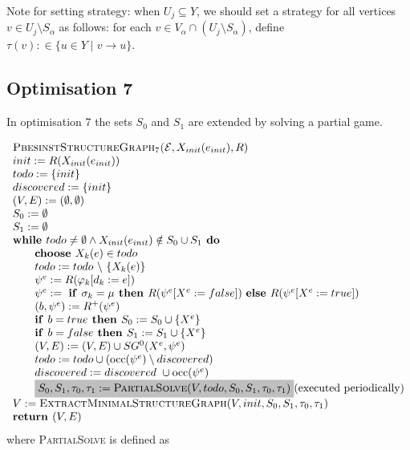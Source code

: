 \documentclass{article}
\newcommand{\Space}{\text{\ }}
\newcommand{\If}{\text{\textbf{if }}}
\newcommand{\Do}{\text{\textbf{ do }}}
\newcommand{\Then}{\text{\textbf{ then }}}
\newcommand{\Else}{\text{\textbf{else }}}
\newcommand{\While}{\text{\textbf{while }}}
\newcommand{\Choose}{\text{\textbf{choose }}}
\newcommand{\Return}{\text{\textbf{return }}}
\begin{document}
Note for setting strategy: when $U_j \subseteq Y$, we should set a strategy for all vertices $v \in U_j \setminus S_\alpha$ as follows: for each $v \in V_\alpha \cap (U_j \setminus S_\alpha)$, define $\tau(v) :\in \{ u \in Y \mid v \to u \}$.

\subsection{Optimisation 7}
In optimisation 7 the sets $S_0$ and $S_1$ are extended by solving a partial game.

\begin{equation*}
\begin{array}{l}
\textsc{PbesinstStructureGraph$_{7}$(}\mathcal{E}, X_{init}(e_{init}), R) \\ 
init:=R(X_{init}(e_{init})) \\
todo:=\{init\} \\
discovered:=\{init\} \\
(V,E) :=(\emptyset ,\emptyset ) \\ 
S_0:= \emptyset \\
S_1:= \emptyset \\
\While todo \neq \emptyset \wedge X_{init}(e_{init}) \notin S_0 \cup S_1 \Do \\ 
\qquad \Choose X_{k}(e)\in todo \\ 
\qquad todo:=todo\ \backslash \ \{X_{k}(e)\} \\ 
\qquad \psi ^{e}:=R(\varphi _{k}[d_{k}:=e]) \\ 
\qquad \psi^e := \Space \If \sigma_k = \mu \Then R(\psi^e[X^e := false])
\Space \Else R(\psi^e[X^e := true]) \\
\qquad (b,\psi^e) := R^+(\psi^e) \\
\qquad \If b = true \Then S_0 := S_0 \cup \{ X^e \} \\
\qquad \If b = false \Then S_1 := S_1 \cup \{ X^e \} \\
\qquad (V,E) := (V,E) \cup SG^{0}(X^{e},\psi ^{e}) \\ 
\qquad todo:=todo\cup (\mathrm{occ}(\psi ^{e})\setminus discovered) \\
\qquad discovered:=discovered\ \cup \mathrm{occ}(\psi ^{e}) \\
\qquad \colorbox{lightgray}{$
S_0, S_1,\tau_0,\tau_1 := \textsc{PartialSolve}(V,todo,S_0,S_1, \tau_0, \tau_1) $} \text{(executed periodically)} \\
V := \textsc{ExtractMinimalStructureGraph}(V, init, S_0, S_1, \tau_0, \tau_1) \\
\Return (V, E)
\end{array}
\end{equation*}
where \textsc{PartialSolve} is defined as
\end{document}
